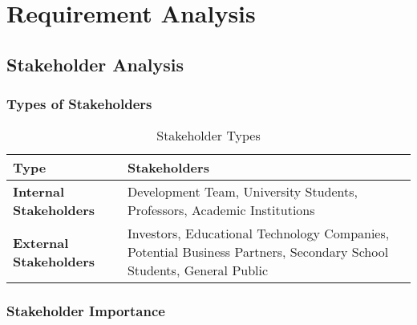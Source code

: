 \chapter{Requirement Analysis}
\label{chap:requirement-analysis}

\section{Stakeholder Analysis}
\label{section:stakeholder-analysis}
% 

\subsection{Types of Stakeholders}

\begin{table}[ht]
    \centering
    \begin{tabularx}{\linewidth}{|l|X|}
        \rowcolor{gray!70}
        \hline
        \textbf{Type} & \textbf{Stakeholders} \\ 
        \hline
        \textbf{Internal Stakeholders} & Development Team, University Students, Professors, Academic Institutions \\ 
        \hline
        \textbf{External Stakeholders} & Investors, Educational Technology Companies, Potential Business Partners, Secondary School Students, General Public \\ 
        \hline
    \end{tabularx}
    \caption{Stakeholder Types}
    \label{tab:stakeholder-types}
\end{table}

\subsection{Stakeholder Importance}

